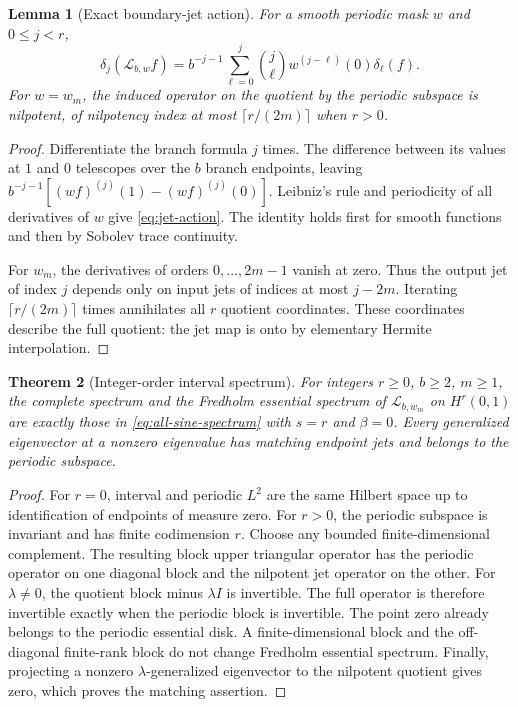 \documentclass[11pt,a4paper]{article}
\newtheorem{theorem}{Theorem}[section]
\newtheorem{lemma}[theorem]{Lemma}
\theoremstyle{definition}
\theoremstyle{remark}
\newcommand{\Lop}{\mathcal L}
\numberwithin{equation}{section}
\begin{document}
\begin{lemma}[Exact boundary-jet action]
\label{lem:jets}
For a smooth periodic mask $w$ and $0\le j<r$,
\begin{equation}
 \delta_j(\Lop_{b,w}f)=b^{-j-1}
 \sum_{\ell=0}^j\binom j\ell w^{(j-\ell)}(0)\delta_\ell(f).
 \label{eq:jet-action}
\end{equation}
For $w=w_m$, the induced operator on the quotient by the periodic subspace
is nilpotent, of nilpotency index at most $\lceil r/(2m)\rceil$ when $r>0$.
\end{lemma}
\begin{proof}
Differentiate the branch formula $j$ times. The difference between its
values at $1$ and $0$ telescopes over the $b$ branch endpoints, leaving
$b^{-j-1}[(wf)^{(j)}(1)-(wf)^{(j)}(0)]$. Leibniz's rule and periodicity
of all derivatives of $w$ give \eqref{eq:jet-action}. The identity holds
first for smooth functions and then by Sobolev trace continuity.

For $w_m$, the derivatives of orders $0,\ldots,2m-1$ vanish at zero.
Thus the output jet of index $j$ depends only on input jets of indices
at most $j-2m$. Iterating $\lceil r/(2m)\rceil$ times annihilates all
$r$ quotient coordinates. These coordinates describe the full quotient:
the jet map is onto by elementary Hermite interpolation.
\end{proof}

\begin{theorem}[Integer-order interval spectrum]
\label{thm:interval}
For integers $r\ge0$, $b\ge2$, $m\ge1$, the complete spectrum and the
Fredholm essential spectrum of $\Lop_{b,w_m}$ on $H^r(0,1)$ are exactly
those in \eqref{eq:all-sine-spectrum} with $s=r$ and $\beta=0$.
Every generalized eigenvector at a nonzero eigenvalue has matching endpoint
jets and belongs to the periodic subspace.
\end{theorem}
\begin{proof}
For $r=0$, interval and periodic $L^2$ are the same Hilbert space up to
identification of endpoints of measure zero. For $r>0$, the periodic
subspace is invariant and has finite codimension $r$.
Choose any bounded finite-dimensional complement. The resulting block
upper triangular operator has the periodic operator on one diagonal block
and the nilpotent jet operator on the other. For $\lambda\ne0$, the
quotient block minus $\lambda I$ is invertible. The full operator is
therefore invertible exactly when the periodic block is invertible.
The point zero already belongs to the periodic essential disk. A
finite-dimensional block and the off-diagonal finite-rank block do not
change Fredholm essential spectrum. Finally, projecting a nonzero
$\lambda$-generalized eigenvector to the nilpotent quotient gives zero,
which proves the matching assertion.
\end{proof}
\end{document}
